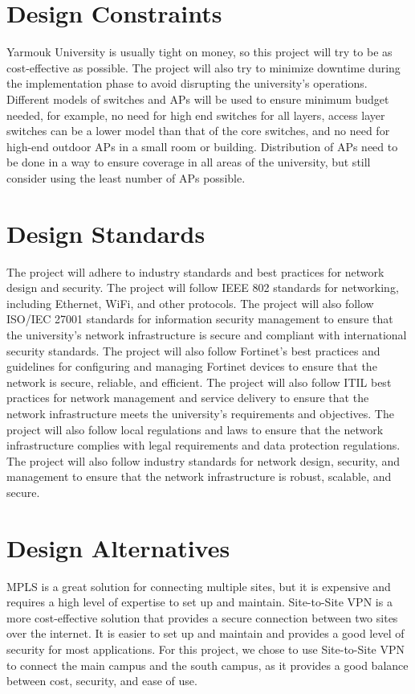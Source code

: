 \documentclass[12pt]{report}
\begin{document}
\section{Design Constraints}
Yarmouk University is usually tight on money, so this project will try to be as cost-effective as possible. The project will also try to minimize downtime during the implementation phase to avoid disrupting the university's operations. Different models of switches and APs will be used to ensure minimum budget needed, for example, no need for high end switches for all layers, access layer switches can be a lower model than that of the core switches, and no need for high-end outdoor APs in a small room or building. Distribution of APs need to be done in a way to ensure coverage in all areas of the university, but still consider using the least number of APs possible. \cite{YUMoneyIssue}

\section{Design Standards}
The project will adhere to industry standards and best practices for network design and security. The project will follow IEEE 802 standards for networking, including Ethernet, WiFi, and other protocols. The project will also follow ISO/IEC 27001 standards for information security management to ensure that the university's network infrastructure is secure and compliant with international security standards. The project will also follow Fortinet's best practices and guidelines for configuring and managing Fortinet devices to ensure that the network is secure, reliable, and efficient. The project will also follow ITIL best practices for network management and service delivery to ensure that the network infrastructure meets the university's requirements and objectives. The project will also follow local regulations and laws to ensure that the network infrastructure complies with legal requirements and data protection regulations. The project will also follow industry standards for network design, security, and management to ensure that the network infrastructure is robust, scalable, and secure. \cite{IEEE802} \cite{ISO27001} \cite{ITIL}

\section{Design Alternatives}
MPLS is a great solution for connecting multiple sites, but it is expensive and requires a high level of expertise to set up and maintain. Site-to-Site VPN is a more cost-effective solution that provides a secure connection between two sites over the internet. It is easier to set up and maintain and provides a good level of security for most applications. For this project, we chose to use Site-to-Site VPN to connect the main campus and the south campus, as it provides a good balance between cost, security, and ease of use.
\newpage
\end{document}
